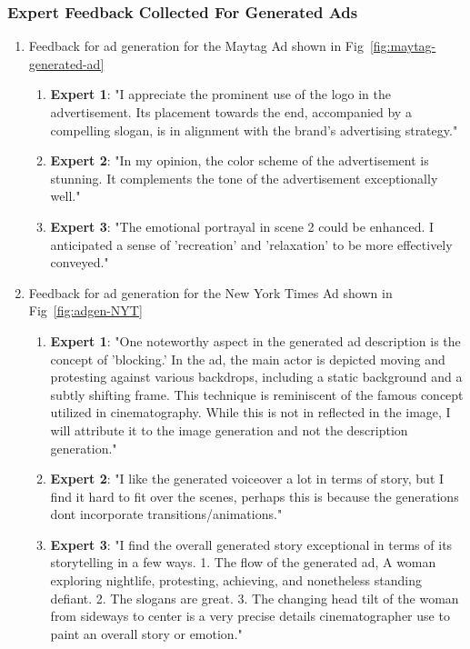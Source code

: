 \subsubsection{Expert Feedback Collected For Generated Ads}
\label{sec:Expert Feedback Collected For Generated Ads}
\begin{enumerate}
    \item Feedback for ad generation for the Maytag Ad shown in Fig~\ref{fig:maytag-generated-ad}
    \begin{enumerate}
        \item \textbf{Expert 1}: "I appreciate the prominent use of the logo in the advertisement. Its placement towards the end, accompanied by a compelling slogan, is in alignment with the brand's advertising strategy."
        \item \textbf{Expert 2}: "In my opinion, the color scheme of the advertisement is stunning. It complements the tone of the advertisement exceptionally well."
        \item \textbf{Expert 3}: "The emotional portrayal in scene 2 could be enhanced. I anticipated a sense of 'recreation' and 'relaxation' to be more effectively conveyed."
    \end{enumerate}
    \item Feedback for ad generation for the New York Times Ad shown in Fig~\ref{fig:adgen-NYT}
    \begin{enumerate}
        \item \textbf{Expert 1}: "One noteworthy aspect in the generated ad description is the concept of 'blocking.' In the ad, the main actor is depicted moving and protesting against various backdrops, including a static background and a subtly shifting frame. This technique is reminiscent of the famous concept utilized in cinematography. While this is not in reflected in the image, I will attribute it to the image generation and not the description generation."
        \item \textbf{Expert 2}: "I like the generated voiceover a lot in terms of story, but I find it hard to fit over the scenes, perhaps this is because the generations dont incorporate transitions/animations."
        \item \textbf{Expert 3}: "I find the overall generated story exceptional in terms of its storytelling in a few ways. 1. The flow of the generated ad, A woman exploring nightlife, protesting, achieving, and nonetheless standing defiant. 2. The slogans are great. 3. The changing head tilt of the woman from sideways to center is a very precise details cinematographer use to paint an overall story or emotion." 

\end{enumerate}
\end{enumerate}
